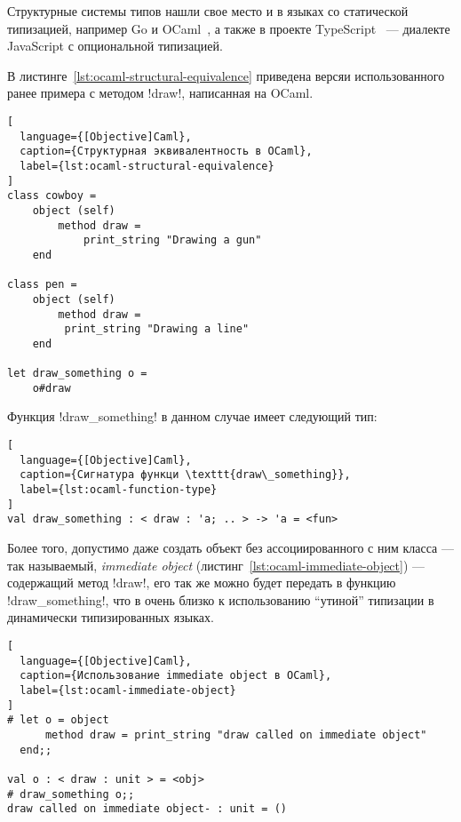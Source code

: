 Структурные системы типов нашли свое место и в языках со статической
типизацией, например Go и OCaml~\cite[с.~33]{Ocaml}, а также в проекте
TypeScript~\cite[]{TypeScript} --- диалекте JavaScript с опциональной
типизацией. 

В листинге~\ref{lst:ocaml-structural-equivalence} приведена версяи
использованного ранее примера с методом !draw!, написанная на OCaml.

\newpage
\begin{lstlisting}[
  language={[Objective]Caml},
  caption={Структурная эквивалентность в OCaml},
  label={lst:ocaml-structural-equivalence}
]
class cowboy =
    object (self)
        method draw =
            print_string "Drawing a gun"
    end

class pen = 
    object (self) 
        method draw =
         print_string "Drawing a line"
    end

let draw_something o =
    o#draw

\end{lstlisting}

Функция !draw_something! в данном случае имеет следующий тип:

\begin{lstlisting}[
  language={[Objective]Caml},
  caption={Сигнатура функци \texttt{draw\_something}},
  label={lst:ocaml-function-type}
]
val draw_something : < draw : 'a; .. > -> 'a = <fun>
\end{lstlisting}

Более того, допустимо даже создать объект без ассоциированного с ним класса --- так
называемый, \emph{immediate object} (листинг~\ref{lst:ocaml-immediate-object})
--- содержащий метод !draw!, его так же можно будет передать в функцию
!draw_something!, что в очень близко к использованию ``утиной'' типизации в
динамически типизированных языках.

\begin{lstlisting}[
  language={[Objective]Caml},
  caption={Использование immediate object в OCaml},
  label={lst:ocaml-immediate-object}
]
# let o = object
      method draw = print_string "draw called on immediate object"
  end;;

val o : < draw : unit > = <obj>
# draw_something o;;
draw called on immediate object- : unit = ()
\end{lstlisting}
\lstset{language=Python}


